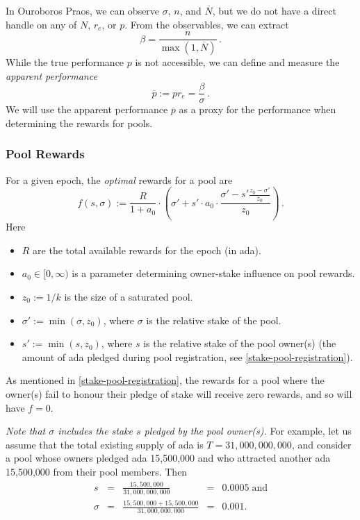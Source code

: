 \documentclass[11pt,a4paper]{article}
\newcommand\pbar{\overline{p}}
\newcommand\Nbar{\overline{N}}
\begin{document}
In Ouroboros Praos, we can observe \(\sigma\), \(n\), and \(\Nbar\), but
we do not have a direct handle on any of \(N\), \(r_e\), or \(p\). From the
observables, we can extract
\begin{equation}
  \beta = \frac{n}{\max(1, \Nbar)}\,.
  \label{eq:beta}
\end{equation}
While the true performance \(p\) is not accessible, we can define and measure
the \emph{apparent performance}
\[
\pbar := p r_e = \frac{\beta}{\sigma}\,.
\]
We will use the apparent performance \(\pbar\) as a proxy for the performance
when determining the rewards for pools.

\subsubsection{Pool Rewards}
\label{pool-rewards}

For a given epoch, the \emph{optimal} rewards for a pool are
\begin{equation}
  f(s,\sigma) :=
  \frac{R}{1 + a_0}
  \cdot
  \left(\sigma' + s'\cdot a_0\cdot\frac{\sigma' -
    s'\frac{z_0-\sigma'}{z_0}}{z_0}\right)\,.
  \label{eq:optimal-rewards}
\end{equation}
Here

\begin{itemize}
\item
  \(R\) are the total available rewards for the epoch (in ada).
\item
  \(a_0\in[0,\infty)\) is a parameter determining owner-stake influence on pool
    rewards.
\item
  \(z_0:=1/k\) is the size of a saturated pool.
\item
  \(\sigma':=\min(\sigma, z_0)\), where \(\sigma\) is the relative stake
  of the pool.
\item
  \(s':=\min(s, z_0)\), where \(s\) is the relative stake of the pool
  owner(s) (the amount of ada pledged during pool registration,
  see \cref{stake-pool-registration}).
\end{itemize}

As mentioned in \cref{stake-pool-registration}, the rewards for a pool
where the owner(s) fail to honour their pledge of stake will receive
zero rewards, and so will have $f=0$.

\emph{Note that \(\sigma\) includes the stake \(s\) pledged by the pool
owner(s).} For example, let us assume that the total existing supply of
ada is \(T=31,000,000,000\), and consider a pool whose owners
pledged ada 15,500,000 and who attracted another ada 15,500,000 from their
pool members. Then \[
\begin{array}{rcccl}
    s                  & = & \displaystyle\frac{15,500,000}{31,000,000,000}              & = & 0.0005\;\text{and} \\[5mm]
    \sigma & = & \displaystyle\frac{15,500,000 + 15,500,000}{31,000,000,000} & = & 0.001. \\
\end{array}
\]
\end{document}
